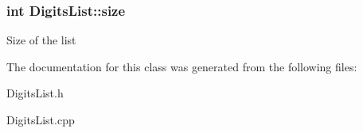\subsubsection[{size}]{\setlength{\rightskip}{0pt plus 5cm}int Digits\+List\+::size}\label{class_digits_list_ae1e9517bd687d1b2727e84a80416b192}
Size of the list 

The documentation for this class was generated from the following files\+:\begin{DoxyCompactItemize}
\item 
Digits\+List.\+h\item 
Digits\+List.\+cpp\end{DoxyCompactItemize}
